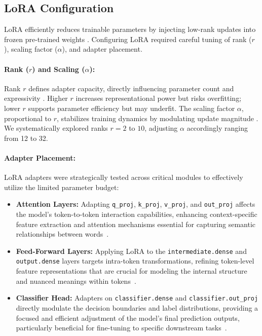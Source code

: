 \documentclass[letterpaper]{article}
\begin{document}
\subsection{LoRA Configuration} LoRA efficiently reduces trainable parameters by injecting low-rank updates into frozen pre-trained weights \cite{hu2022lora}. Configuring LoRA required careful tuning of rank ($r$), scaling factor ($\alpha$), and adapter placement.

\paragraph{Rank ($r$) and Scaling ($\alpha$):} Rank $r$ defines adapter capacity, directly influencing parameter count and expressivity \cite{hu2022lora}. Higher $r$ increases representational power but risks overfitting; lower $r$ supports parameter efficiency but may underfit. The scaling factor $\alpha$, proportional to $r$, stabilizes training dynamics by modulating update magnitude \cite{li2023lora}. We systematically explored ranks $r=2$ to $10$, adjusting $\alpha$ accordingly ranging from 12 to 32.

\paragraph{Adapter Placement:} LoRA adapters were strategically tested across critical modules to effectively utilize the limited parameter budget:

\begin{itemize}
    \item \textbf{Attention Layers:} Adapting \texttt{q\_proj}, \texttt{k\_proj}, \texttt{v\_proj}, and \texttt{out\_proj} affects the model’s token-to-token interaction capabilities, enhancing context-specific feature extraction and attention mechanisms essential for capturing semantic relationships between words~\cite{vaswani2017attention}.
    \item \textbf{Feed-Forward Layers:} Applying LoRA to the \texttt{intermediate.dense} and \texttt{output.dense} layers targets intra-token transformations, refining token-level feature representations that are crucial for modeling the internal structure and nuanced meanings within tokens~\cite{liu2019roberta}.
    \item \textbf{Classifier Head:} Adapters on \texttt{classifier.dense} and \texttt{classifier.out\_proj} directly modulate the decision boundaries and label distributions, providing a focused and efficient adjustment of the model's final prediction outputs, particularly beneficial for fine-tuning to specific downstream tasks~\cite{kovaleva2019revealing}.
\end{itemize}
\end{document}
